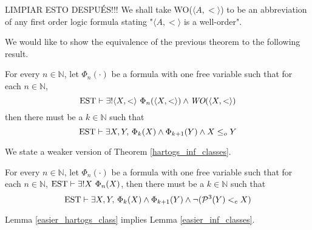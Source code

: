 \begin{notation}
	LIMPIAR ESTO DESPUÉS!!! We shall take WO($\langle A,<\rangle$) to be an abbreviation of any first order logic formula stating "$\langle A,<\rangle$ is a well-order".
\end{notation}

We would like to show the equivalence of the previous theorem to the following result.

\begin{lemma}
	\label{easier_hartogs_class}
	For every $n\in\mathbb{N}$, let $\Phi_n(\cdot)$ be a formula with one free variable such that for each $n\in\mathbb{N}$, 
	\[
		\operatorname{EST} \vdash \exists! \langle X, < \rangle \ \Phi_n ( \langle X,<\rangle) \land 
		\emph{WO}(\langle X, < \rangle)
	\]
	then there must be a $k \in \mathbb{N}$ such that 
	\[
		\operatorname{EST} \vdash \exists X,Y, \, \Phi_k (X) \land \Phi_{k+1} (Y) \land X \leq_o Y
	\]
\end{lemma}

We state a weaker version of Theorem \ref{hartogs_inf_classes}.

\begin{lemma}
	\label{easier_inf_classes}
	For every $n\in\mathbb{N}$, let $\Phi_n(\cdot)$ be a formula with one free variable such that for each $n\in\mathbb{N}$, $\operatorname{EST} \vdash \exists! X \ \Phi_n (X)$, then there must be a $k \in \mathbb{N}$ such that 
	\[
		\operatorname{EST} \vdash \exists X,Y ,\, \Phi_k (X) \land \Phi_{k+1} (Y) \land \neg(\mathcal{P}^{3}(Y) <_c X)
	\]
\end{lemma}

\begin{theorem}
	Lemma \ref{easier_hartogs_class} implies Lemma \ref{easier_inf_classes}.
\end{theorem}


